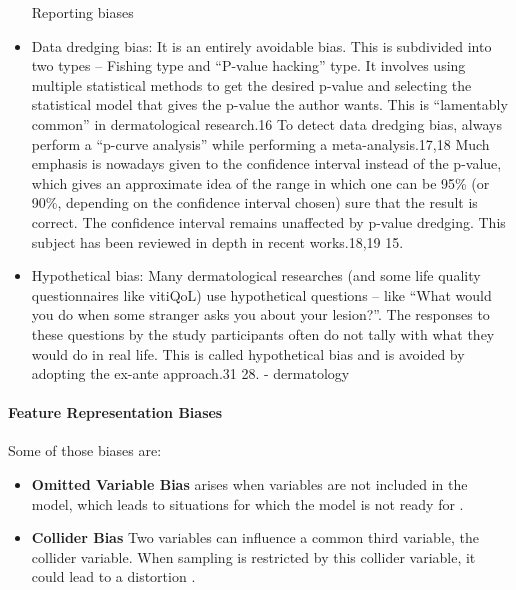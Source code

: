 \begin{refsection}
\begin{itemize}
			Reporting biases
			\item  Data dredging bias: It is an entirely avoidable bias. This is subdivided into two types – Fishing type and “P-value hacking” type. It involves using multiple statistical methods to get the desired p-value and selecting the statistical model that gives the p-value the author wants. This is “lamentably common” in dermatological research.16 To detect data dredging bias, always perform a “p-curve analysis” while performing a meta-analysis.17,18 Much emphasis is nowadays given to the confidence interval instead of the p-value, which gives an approximate idea of the range in which one can be 95\% (or 90\%, depending on the confidence interval chosen) sure that the result is correct. The confidence interval remains unaffected by p-value dredging. This subject has been reviewed in depth in recent works.18,19 15.\autocite{Chakraborty_2024}
			
			\item Hypothetical bias: Many dermatological researches (and some life quality questionnaires like vitiQoL) use hypothetical questions – like “What would you do when some stranger asks you about your lesion?”. The responses to these questions by the study participants often do not tally with what they would do in real life. This is called hypothetical bias and is avoided by adopting the ex-ante approach.31 28. \autocite{Chakraborty_2024} - dermatology
			\rawcitationusedend
		\end{itemize}
		\rawcitationend
		
		\paragraph{Feature Representation Biases}
		
		Some of those biases are:
		\begin{itemize}
			\item \textbf{Omitted Variable Bias} arises when variables are not included in the model, which leads to situations for which the model is not ready for \autocites{Mehrabi_2021}{Mester_2022}\autocites{M38_Clarke_2005}{M131_Riegg_2008}\autocite{M114_Mustard_2003}.
			\item \textbf{Collider Bias} Two variables can influence a common third variable, the collider variable. When sampling is restricted by this collider variable, it could lead to a distortion  \autocite{Chakraborty_2024, c4,c8,c9}.
		\end{itemize}
		

\end{refsection}
